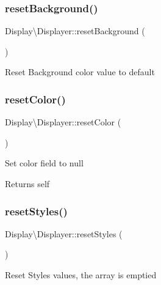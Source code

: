 \subsubsection{\texorpdfstring{reset\+Background()}{resetBackground()}}
{\footnotesize\ttfamily Display\textbackslash{}\+Displayer\+::reset\+Background (\begin{DoxyParamCaption}{ }\end{DoxyParamCaption})}

Reset Background color value to default \mbox{\label{classDisplay_1_1Displayer_af1da840727c16ebc4f08bbec07e5f86a}} 
\subsubsection{\texorpdfstring{reset\+Color()}{resetColor()}}
{\footnotesize\ttfamily Display\textbackslash{}\+Displayer\+::reset\+Color (\begin{DoxyParamCaption}{ }\end{DoxyParamCaption})}

Set color field to null

\begin{DoxyReturn}{Returns}
self 
\end{DoxyReturn}
\mbox{\label{classDisplay_1_1Displayer_ad30a8f26128fb57aa7b862a7eb899c0b}} 
\subsubsection{\texorpdfstring{reset\+Styles()}{resetStyles()}}
{\footnotesize\ttfamily Display\textbackslash{}\+Displayer\+::reset\+Styles (\begin{DoxyParamCaption}{ }\end{DoxyParamCaption})}

Reset Styles values, the array is emptied \mbox{\label{classDisplay_1_1Displayer_a99a0bbaef46d045ad055692abaf153c3}} 
